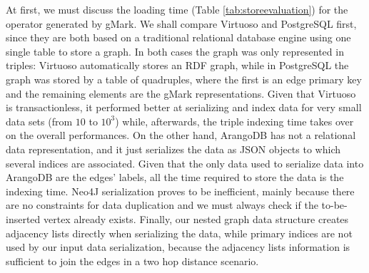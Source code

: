 At first, we must discuss the  loading time (Table \ref{tab:storeevaluation}) for the operator generated by gMark. We shall  compare Virtuoso and PostgreSQL first, since they are both based on a traditional relational database engine using one single table to store a graph. In both cases the graph was only represented in triples: Virtuoso automatically stores an RDF graph, while in PostgreSQL the graph was stored by a table of quadruples, where the first is an edge primary key and the remaining elements are the gMark representations. Given that Virtuoso is transactionless, it performed better at serializing and index data for very small data sets (from $10$ to $10^3$) while, afterwards, the triple indexing time takes over on the overall performances. On the other hand, ArangoDB has not a relational data representation, and it just serializes the data as JSON objects to which several indices are associated. Given that the only data used to serialize data into ArangoDB are the edges' labels, all the time required to store the data is the indexing time. Neo4J serialization proves to be inefficient, mainly because there are no constraints for data duplication and we must always check if the to-be-inserted vertex already exists. Finally, our nested graph data structure creates adjacency lists directly when serializing the data, while primary indices are not used by our input data serialization, because the adjacency lists information is sufficient to join the edges in a two hop distance scenario.

